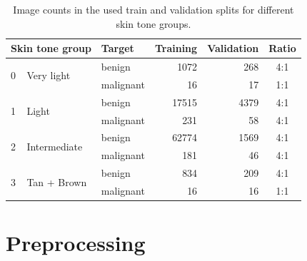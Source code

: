 \begin{table}[]
\centering
\caption{Image counts in the used train and validation splits for different skin tone groups.}
\label{tab:data-split}

\begin{tabular}{@{}lllrrc@{}}
\toprule
\multicolumn{2}{l}{\textbf{Skin tone group}}       & \textbf{Target} & \multicolumn{1}{l}{\textbf{Training}} & \multicolumn{1}{l}{\textbf{Validation}} & \multicolumn{1}{l}{\textbf{Ratio}} \\ \midrule
\multirow{2}{*}{0} & \multirow{2}{*}{Very light}   & benign          & 1072                                  & 268                                     & 4:1                                \\
                   &                               & malignant       & 16                                    & 17                                      & 1:1                                \\
\multirow{2}{*}{1} & \multirow{2}{*}{Light}        & benign          & 17515                                 & 4379                                    & 4:1                                \\
                   &                               & malignant       & 231                                   & 58                                      & 4:1                                \\
\multirow{2}{*}{2} & \multirow{2}{*}{Intermediate} & benign          & 62774                                 & 1569                                    & 4:1                                \\
                   &                               & malignant       & 181                                   & 46                                      & 4:1                                \\
\multirow{2}{*}{3} & \multirow{2}{*}{Tan + Brown}  & benign          & 834                                   & 209                                     & 4:1                                \\
                   &                               & malignant       & 16                                    & 16                                      & 1:1                                \\ \bottomrule
\end{tabular}
\end{table}

\section{Preprocessing}

